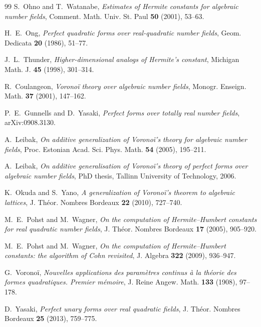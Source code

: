 \documentclass[11pt]{amsart}
\theoremstyle{definition}
\theoremstyle{remark}
\begin{document}
\begin{thebibliography}{99}
S.~Ohno and T.~Watanabe, \emph{Estimates of Hermite constants for algebraic number fields},
Comment. Math. Univ. St. Paul \textbf{50} (2001), 53--63.

H.~E.~Ong, \emph{Perfect quadratic forms over real-quadratic number fields}, Geom. Dedicata
\textbf{20} (1986), 51--77.

J.~L.~Thunder, \emph{Higher-dimensional analogs of Hermite's constant}, Michigan Math. J. \textbf{45}
(1998), 301--314.

R.~Coulangeon, \emph{Vorono\"i theory over algebraic number fields}, Monogr. Enseign. Math. \textbf{37}
(2001), 147--162.

P.~E.~Gunnells and D.~Yasaki, \emph{Perfect forms over totally real number fields}, arXiv:0908.3130.

A.~Leibak, \emph{On additive generalization of Vorono\"i's theory for algebraic number fields},
Proc. Estonian Acad. Sci. Phys. Math. \textbf{54} (2005), 195--211.

A.~Leibak, \emph{On additive generalisation of Vorono\"i's theory of perfect forms over algebraic
number fields}, PhD thesis, Tallinn University of Technology, 2006.

K.~Okuda and S.~Yano, \emph{A generalization of Vorono\"i's theorem to algebraic lattices},
J. Th\'eor. Nombres Bordeaux \textbf{22} (2010), 727--740.

M.~E.~Pohst and M.~Wagner, \emph{On the computation of Hermite--Humbert constants for real quadratic
number fields}, J. Th\'eor. Nombres Bordeaux \textbf{17} (2005), 905--920.

M.~E.~Pohst and M.~Wagner, \emph{On the computation of Hermite--Humbert constants: the algorithm
of Cohn revisited}, J. Algebra \textbf{322} (2009), 936--947.

G.~Vorono\"i, \emph{Nouvelles applications des param\`etres continus \`a la th\'eorie des formes
quadratiques. Premier m\'emoire}, J. Reine Angew. Math. \textbf{133} (1908), 97--178.

D.~Yasaki, \emph{Perfect unary forms over real quadratic fields}, J. Th\'eor. Nombres Bordeaux
\textbf{25} (2013), 759--775.

\end{thebibliography}
\end{document}
